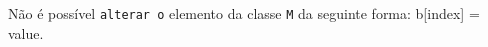 \documentclass[12pt,varwidth=16cm,border=1pt]{standalone}
\begin{document}
Não é possível \verb+alterar o+ elemento da classe \verb+M+ da seguinte forma: b[index] = value.

\questiomfalse
\end{document}
